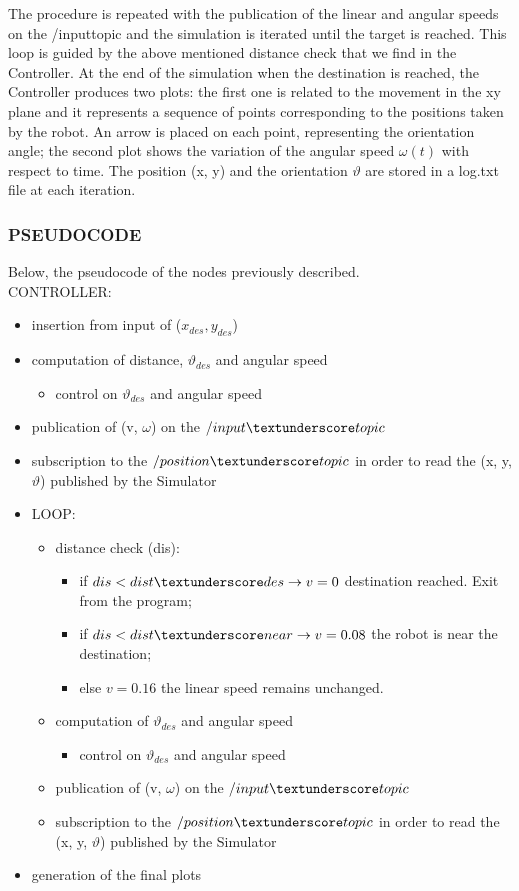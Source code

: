 \documentclass[a4paper,11pt,oneside]{book}
\begin{document}
The procedure is repeated with the publication of the linear and angular speeds on the /input\textunderscore topic and the simulation is iterated until the target is reached. This loop is guided by the above mentioned distance check that we find in the Controller. At the end of the simulation when the destination is reached, the Controller produces two plots: the first one is related to the movement in the xy plane and it represents a sequence of points corresponding to the positions taken by the robot. An arrow is placed on each point, representing the orientation angle; the second plot shows the variation of the angular speed $\omega(t)$ with respect to time. The position (x, y) and the orientation $\vartheta$ are stored in a log.txt file at each iteration.

\subsubsection{PSEUDOCODE}
Below, the pseudocode of the nodes previously described.\\
CONTROLLER:
\begin{itemize}
\item insertion from input of ($x_{des}, y_{des}$)
\item computation of distance,  $\vartheta_{des}$ and angular speed
\begin{itemize}
\item control on $\vartheta_{des}$  and angular speed
\end{itemize}
\item publication of (v, $\omega$) on the $/input\textunderscore topic$
\item subscription to the $/position\textunderscore topic$ in order to read the (x, y, $\vartheta$) published by the Simulator
\item LOOP:
\begin{itemize}
\item distance check (dis):
\begin{itemize}
\item if $dis < dist\textunderscore des \rightarrow v = 0$ destination reached. Exit from the program;
\item if $dis < dist\textunderscore near \rightarrow v = 0.08$ the robot is near the destination;
\item else $v = 0.16$ the linear speed remains unchanged.
\end{itemize}
\item computation of  $\vartheta_{des}$ and angular speed
\begin{itemize}
\item control on  $\vartheta_{des}$  and angular speed
\end{itemize}
\item publication of (v, $\omega$) on the $/input\textunderscore topic$
\item subscription to the $/position\textunderscore topic$ in order to read the (x, y, $\vartheta$) published by the Simulator
\end{itemize}
\item generation of the final plots
\end{itemize}
\end{document}
